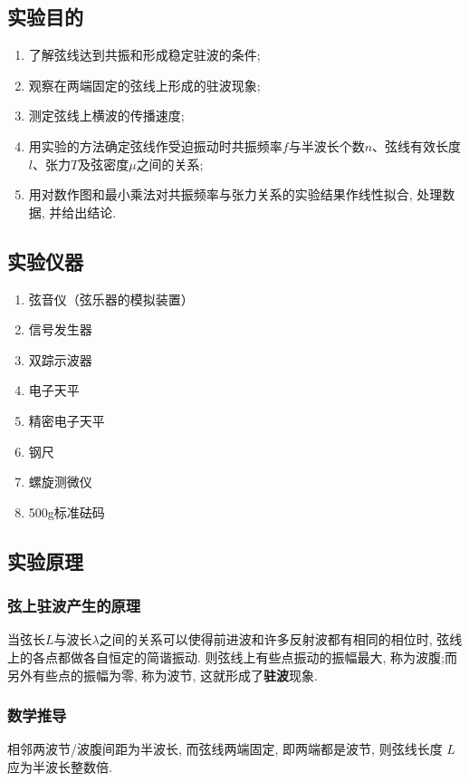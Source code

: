 \documentclass[zihao=5, UTF8]{article}
\theoremstyle{MyLineTheoremStyle} %
\theoremstyle{MyBlockTheoremStyle} %
\theoremstyle{MySubsubsectionStyle} %
\begin{document}
\subsection{实验目的}
\begin{enumerate}
    \item 了解弦线达到共振和形成稳定驻波的条件;
    \item 观察在两端固定的弦线上形成的驻波现象;
    \item 测定弦线上横波的传播速度;
    \item 用实验的方法确定弦线作受迫振动时共振频率$f$与半波长个数$n$、弦线有效长度$l$、张力$T$及弦密度$\mu$之间的关系;
    \item 用对数作图和最小乘法对共振频率与张力关系的实验结果作线性拟合, 处理数据, 并给出结论. 
\end{enumerate}
\subsection{实验仪器}
\begin{enumerate}
    \item 弦音仪（弦乐器的模拟装置）
    \item 信号发生器
    \item 双踪示波器
    \item 电子天平
    \item 精密电子天平
    \item 钢尺
    \item 螺旋测微仪
    \item 500g标准砝码
\end{enumerate}
\subsection{实验原理}
\subsubsection{弦上驻波产生的原理}

当弦长$L$与波长$\lambda$之间的关系可以使得前进波和许多反射波都有相同的相位时, 弦线上的各点都做各自恒定的简谐振动. 则弦线上有些点振动的振幅最大, 称为波腹;而另外有些点的振幅为零, 称为波节, 这就形成了\textbf{驻波}现象.

\subsubsection{数学推导}
相邻两波节/波腹间距为半波长, 而弦线两端固定, 即两端都是波节, 则弦线长度 $L$ 应为半波长整数倍. 
\end{document}
